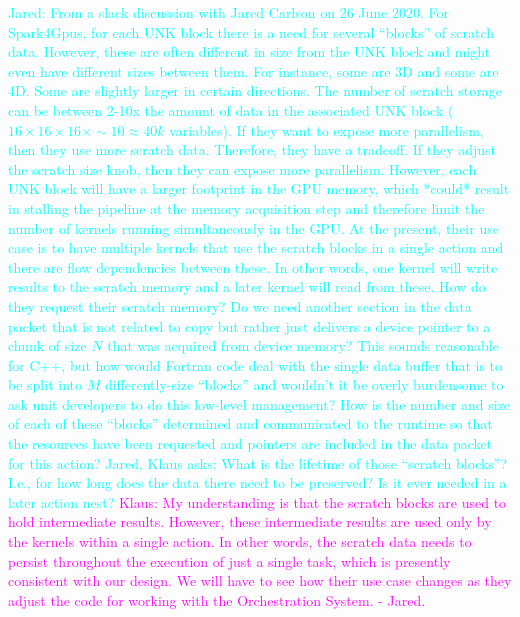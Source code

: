 \documentclass{article}
\newcommand{\Jared}[1]          {\textcolor{cyan}{Jared: #1}}
\newcommand{\JaredQfromKW}[1]   {\textcolor{cyan}{Jared, Klaus asks: #1}}
\newcommand{\KlausRfromJO}[1]   {\textcolor{magenta}{Klaus: #1 - Jared.}}
\begin{document}
\Jared{From a slack discussion with Jared Carlson on 26 June 2020.  For
Spark4Gpus, for each UNK block there is a need for several ``blocks'' of scratch
data.  However, these are often different in size from the UNK block and might
even have different sizes between them.  For instance, some are 3D and some are
4D.  Some are slightly larger in certain directions.  The number of scratch
storage can be between 2-10x the amount of data in the associated UNK block ($16
\times 16 \times 16 \times \sim 10 \approx 40k$ variables).  If they want to
expose more parallelism, then they use more scratch data.  Therefore, they have
a tradeoff.  If they adjust the scratch size knob, then they can expose more
parallelism.  However, each UNK block will have a larger footprint in the GPU
memory, which *could* result in stalling the pipeline at the memory acquisition
step and therefore limit the number of kernels running simultaneously in the
GPU.  At the present, their use case is to have multiple kernels that use the
scratch blocks in a single action and there are flow dependencies between these.
In other words, one kernel will write results to the scratch memory and a later
kernel will read from these.  How do they request their scratch memory?  Do we
need another section in the data packet that is not related to copy but rather
just delivers a device pointer to a chunk of size $N$ that was acquired from
device memory?  This sounds reasonable for C++, but how would Fortran code deal
with the single data buffer that is to be split into $M$ differently-size
``blocks'' and wouldn't it be overly burdensome to ask unit developers to do
this low-level management?  How is the number and size of each of these
``blocks'' determined and communicated to the runtime so that the resources have
been requested and pointers are included in the data packet for this action?}
\JaredQfromKW{What is the lifetime of those ``scratch blocks''? I.e., for how long
does the data there need to be preserved? Is it ever needed in a later
action nest?}  \KlausRfromJO{My understanding is that the scratch blocks are
used to hold intermediate results.  However, these intermediate results are used
only by the kernels within a single action.  In other words, the scratch data
needs to persist throughout the execution of just a single task, which is
presently consistent with our design.  We will have to see how their use case
changes as they adjust the code for working with the Orchestration System.}
\end{document}
